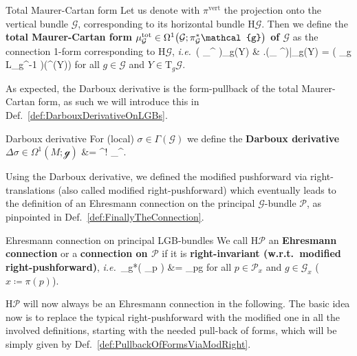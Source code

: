 \documentclass[a4paper,oneside,11pt,bibliography=totoc]{scrartcl}
\def\bas#1\eas{\begin{align*}#1\end{align*}}
\theoremstyle{plain}
\theoremstyle{remark}
\theoremstyle{definition}
\begin{document}
\begin{definitions*}{Total Maurer-Cartan form}
Let us denote with $\pi^{\mathrm{vert}}$ the projection onto the vertical bundle $\mathcal{G}$, corresponding to its horizontal bundle $\mathrm{H}\mathcal{G}$. Then we define the \textbf{total Maurer-Cartan form $\mu_{\mathcal{G}}^{\mathrm{tot}} \in \Omega^1\mleft(\mathcal{G}; \pi_{\mathcal{G}}^*\mathcal{g}\mright)$ of $\mathcal{G}$} as the connection 1-form corresponding to $\mathrm{H}\mathcal{G}$, \textit{i.e.}\
\bas
\mleft( \mu_{\mathcal{G}}^{\mathrm{tot}} \mright)_g(Y)
&\coloneqq
\mleft.\mleft(\mu_\mathcal{G} \circ \pi^{\mathrm{vert}}\mright)\mright|_g(Y)
=
\mleft( \mathrm{D}_g L_{g^{-1}} \mright)\mleft(\pi^{\mathrm{vert}}(Y)\mright)
\eas
for all $g \in \mathcal{G}$ and $Y \in \mathrm{T}_g\mathcal{G}$.
\end{definitions*}

As expected, the Darboux derivative is the form-pullback of the total Maurer-Cartan form, as such we will introduce this in Def.\ \ref{def:DarbouxDerivativeOnLGBs}.

\begin{definitions*}{Darboux derivative}
For (local) $\sigma \in \Gamma(\mathcal{G})$ we define the \textbf{Darboux derivative $\Delta \sigma \in \Omega^1(M; \mathcal{g})$}
\bas
\Delta \sigma
&=
\sigma^! \mu_{}^{}.
\eas
\end{definitions*}

Using the Darboux derivative, we defined the modified pushforward via right-translations (also called modified right-pushforward) which eventually leads to the definition of an Ehresmann connection on the principal $\mathcal{G}$-bundle $\mathcal{P}$, as pinpointed in Def.\ \ref{def:FinallyTheConnection}.

\begin{definitions*}{Ehresmann connection on principal LGB-bundles}
We call $$ an \textbf{Ehresmann connection} or a \textbf{connection on $\mathcal{P}$} if it is \textbf{right-invariant (w.r.t.\ modified right-pushforward)}, \textit{i.e.}\
\bas
\mathcal{r}_{g*}\mleft( _p \mright)
&=
\mathrm{H}_{p\cdot g}\mathcal{P}
\eas
for all $p \in \mathcal{P}_x$ and $g \in {}_x$ ($x \coloneqq \pi(p)$).
\end{definitions*}

$\mathrm{H}\mathcal{P}$ will now always be an Ehresmann connection in the following.
The basic idea now is to replace the typical right-pushforward with the modified one in all the involved definitions, starting with the needed pull-back of forms, which will be simply given by Def.\ \ref{def:PullbackOfFormsViaModRight}.
\end{document}
